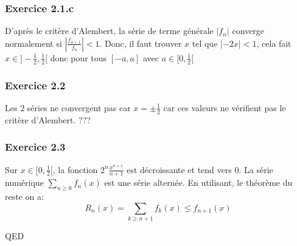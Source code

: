 \documentclass[]{book}
\theoremstyle{definition}
\begin{document}
\subsubsection*{Exercice 2.1.c}
D'apr\`es le crit\`ere d'Alembert, la s\'erie de terme g\'en\'erale $\lvert f_n \rvert$ converge normalement si $\left\lvert \frac{f_{n+1}}{f_n} \right\rvert < 1$. Donc, il faut trouver $x$ tel que  $\lvert -2x \rvert < 1$, cela fait $x \in ]-\frac{1}{2}, \frac{1}{2}[$ donc pour tous $[-a,a]$ avec $a \in [0,\frac{1}{2}[$


\subsubsection*{Exercice 2.2}
Les 2 s\'eries ne convergent pas car $x=\pm \frac{1}{2}$ car ces valeurs ne v\'erifient pas le crit\`ere d'Alembert. ???


\subsubsection*{Exercice 2.3}
Sur $x \in [0,\frac{1}{2}[$, la fonction $2^n\frac{x^{n+1}}{n+1}$ est d\'ecroissante et tend vers 0. La s\'erie num\'erique $\sum_{n \ge 0} f_n(x)$ est une s\'erie altern\'ee. En utilisant, le th\'eor\`eme du reste on a:
$$R_n(x) = \sum_{k \ge n+1}f_k(x) \le f_{n+1}(x)$$
 

QED
\end{document}
